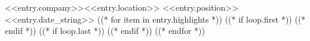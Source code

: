 \resumeSubheading
    {<<entry.company>>}{<<entry.location>>}
    {<<entry.position>>}{<<entry.date_string>>}
((* for item in entry.highlights *))
    ((* if loop.first *))
    \resumeItemListStart
    ((* endif *))
    ((* if loop.last *))
    \resumeItemListEnd
    ((* endif *))
((* endfor *))